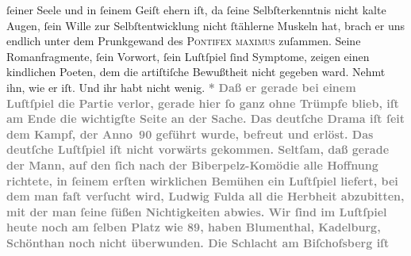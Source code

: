 \begin{ledgroupsized}[t]{13cm}
{{                  ſeiner Seele und in ſeinem Geiſt ehern iſt, da ſeine Selbſterkenntnis nicht kalte
                  Augen, ſein Wille zur Selbſtentwicklung nicht ſtählerne Muskeln hat, brach er uns
                  endlich unter dem Prunkgewand des \textsc{Pontifex maximus}
                  zuſammen. Seine Romanfragmente, ſein Vorwort, ſein Luſtſpiel ſind Symptome, zeigen
                  einen kindlichen Poeten, dem die artiſtiſche Bewußtheit nicht gegeben ward. Nehmt
                  ihn, wie er iſt. Und ihr habt nicht wenig.}}\pend
           \pstart
           \centering{}\textcolor{gray}{\textbf{*}}\pend
           \pstart
           \noindent{}\textcolor{gray}{\textbf{Daß er gerade bei einem Luſtſpiel die Partie verlor, gerade hier
                  ſo ganz ohne Trümpfe blieb, iſt am Ende die wichtigſte Seite an der Sache. Das
                  deutſche Drama iſt ſeit dem Kampf, der Anno 90 geführt wurde, befreut und erlöst.
                  Das deutſche Luſtſpiel iſt nicht vorwärts gekommen. Seltſam, daß gerade der Mann,
                  auf den ſich nach der Biberpelz-Komödie alle
                  Hoffnung richtete, in ſeinem erſten wirklichen Bemühen ein Luſtſpiel liefert, bei
                  dem man faſt verſucht wird, Ludwig Fulda
                  all die Herbheit abzubitten, mit der man ſeine ſüßen Nichtigkeiten abwies. Wir
                  ſind im Luſtſpiel heute noch am ſelben Platz wie 89, haben Blumenthal, Kadelburg, Schönthan noch nicht
                  überwunden. Die Schlacht am Biſchofsberg iſt
}}
\end{ledgroupsized}
